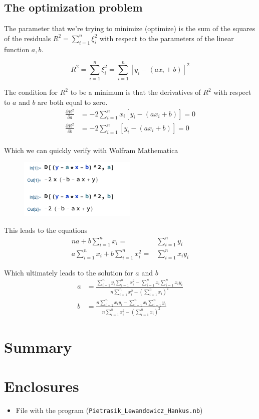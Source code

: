 \documentclass{MathematicaReport}
\begin{document}
\subsection{The optimization problem}
The parameter that we're trying to minimize (optimize) is the sum of the squares
of the residuals \( R^2 = \sum_{i=1}^{n} \xi_i^2 \) with respect to the parameters of 
the linear function \( a, b \).

\[
	R^2 = \sum_{i=1}^{n} \xi_i^2 = \sum_{i=1}^{n} \left[ y_i - (ax_i + b) \right]^2
\]

The condition for \( R^2 \) to be a minimum is that the derivatives of \( R^2 \)
with respect to \( a \) and \( b \) are both equal to zero.
\begin{equation*}
	\begin{aligned}
		\frac{\partial R^2}{\partial a} & = -2\sum_{i=1}^n x_i[y_i-(ax_i+b)] = 0 \\
		\frac{\partial R^2}{\partial b} & = -2\sum_{i=1}^n [y_i-(ax_i+b)] = 0 \\
	\end{aligned}
\end{equation*}

Which we can quickly verify with Wolfram Mathematica
\begin{figure}[H]
\centering
\includegraphics[width=0.5\textwidth]{images/least_squares_derivatives.png}
\end{figure}

This leads to the equations
\begin{equation*}
	\begin{aligned}
		na + b \sum_{i=1}^{n} x_i	= & \sum_{i=1}^{n} y_i \\
		a \sum_{i=1}^{n} x_i + b \sum_{i=1}^{n} x_i^2 = & \sum_{i=1}^{n} x_i y_i
	\end{aligned}
\end{equation*}

Which ultimately leads to the solution for \( a \) and \( b \)
\begin{equation*}
	\begin{aligned}
	a & = \frac{\sum_{i=1}^{n}y_i\sum_{i=1}^{n}x_i^2-\sum_{i=1}^{n}x_i\sum_{i=1}^{n}x_iy_i}{n\sum_{i=1}^{n}x_i^2-(\sum_{i=1}^{n}x_i)^2} \\
	b & = \frac{n\sum_{i=1}^{n}x_iy_i-\sum_{i=1}^{n}x_i\sum_{i=1}^{n}y_i}{n\sum_{i=1}^{n}x_i^2-(\sum_{i=1}^{n}x_i)^2}
	\end{aligned}
\end{equation*}


\section{Summary}

\section*{Enclosures} 
\begin{itemize}
	\item File with the program (\texttt{Pietrasik\_Lewandowicz\_Hankus.nb})
\end{itemize}
\end{document}
